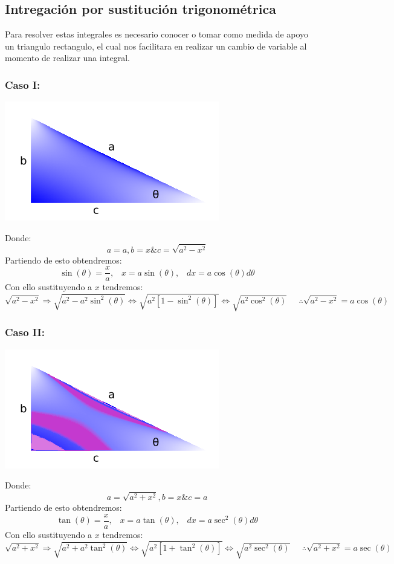 \documentclass[10pt]{article}
\begin{document}
\subsection{Intregación por sustitución trigonométrica}
Para resolver estas integrales es necesario conocer o tomar como medida de apoyo un triangulo rectangulo, el cual nos facilitara en realizar un cambio de variable al momento de realizar una integral.\\
\subsubsection{Caso I:}
\begin{center}
  \includegraphics[scale=0.5]{imgsAux/triangulo.png}\\
\end{center}
Donde:
\[a=a, b=x \& c=\sqrt{a^{2}-x^{2}}\]
Partiendo de esto obtendremos:
\[\sin(\theta)= \frac{x}{a},\;\;\; x=a\sin(\theta),\;\;\; dx=a\cos(\theta)d\theta\]
Con ello sustituyendo a $x$ tendremos:
\[\sqrt{a^{2}-x^{2}}\Rightarrow \sqrt{a^{2}-a^{2}\sin^{2}(\theta)} \Leftrightarrow \sqrt{a^{2}[1-\sin^{2}(\theta)]} \Leftrightarrow \sqrt{a^{2}\cos^{2}(\theta)}\;\;\;\;\; \therefore \sqrt{a^{2}-x^{2}}=a\cos(\theta)\]
\subsubsection{Caso II:}
\begin{center}
  \includegraphics[scale=0.5]{imgsAux/triangulo1.png}\\
\end{center}
Donde:
\[a=\sqrt{a^{2}+x^{2}}, b=x \& c=a\]
Partiendo de esto obtendremos:
\[\tan(\theta)= \frac{x}{a},\;\;\; x=a\tan(\theta),\;\;\; dx=a\sec^{2}(\theta)d\theta\]
Con ello sustituyendo a $x$ tendremos:
\[\sqrt{a^{2}+x^{2}}\Rightarrow \sqrt{a^{2}+a^{2}\tan^{2}(\theta)} \Leftrightarrow \sqrt{a^{2}[1+\tan^{2}(\theta)]} \Leftrightarrow \sqrt{a^{2}\sec^{2}(\theta)}\;\;\;\;\; \therefore \sqrt{a^{2}+x^{2}}=a\sec(\theta)\]
\clearpage
\end{document}
